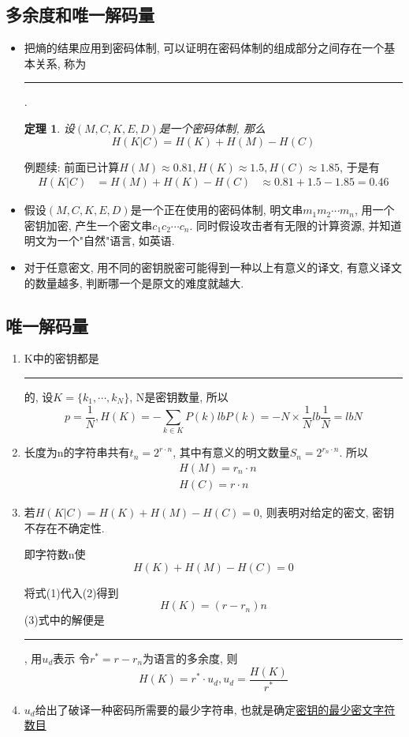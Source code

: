 \documentclass[UTF8]{ctexart}
\newcommand\hl{\bgroup\markoverwith
  {\textcolor{yellow}{\rule[-.5ex]{2pt}{2.5ex}}}\ULon}
\newtheorem{theorem}{\hspace{2em}定理}[section]
\begin{document}
\subsection{多余度和唯一解码量}
\begin{itemize}
  \item 把熵的结果应用到密码体制, 可以证明在密码体制的组成部分之间存在一个基本关系, 称为\hl{密钥暧昧度}.
  \begin{theorem}
    设$(M,C,K,E,D)$是一个密码体制, 那么
    $$H(K|C)=H(K)+H(M)-H(C)$$
  \end{theorem}

  例题续: 前面已计算$H(M)\approx 0.81, H(K)\approx 1.5, H(C)\approx 1.85$, 于是有
  $$
  \begin{aligned}
    H(K|C)&=H(M)+H(K)-H(C)
          &\approx 0.81+1.5-1.85=0.46
  \end{aligned}
  $$
  \item 假设$(M,C,K,E,D)$是一个正在使用的密码体制, 明文串$m_1m_2\cdots m_n$, 用一个密钥加密, 产生一个密文串$c_1c_2\cdots c_n$. 同时假设攻击者有无限的计算资源, 并知道明文为一个"自然"语言, 如英语.
  \item 对于任意密文, 用不同的密钥脱密可能得到一种以上有意义的译文, 有意义译文的数量越多, 判断哪一个是原文的难度就越大.
\end{itemize}

\subsection{唯一解码量}
\begin{enumerate}
  \item K中的密钥都是\hl{等概率}的, 设$K=\{k_1, \cdots, k_N\}$, N是密钥数量, 所以
  $$p=\frac{1}{N}, H(K)=-\sum\limits_{k\in K}P(k)lbP(k)=-N\times \frac{1}{N}lb\frac{1}{N}=lbN$$
  \item 长度为n的字符串共有$t_n=2^{r\cdot n}$, 其中有意义的明文数量$S_n=2^{r_n\cdot n}$. 所以
  \begin{equation}
    \begin{aligned}
      &H(M)=r_n\cdot n\\
      &H(C)=r\cdot n
    \end{aligned}
  \end{equation}
  \item 若$H(K|C)=H(K)+H(M)-H(C)=0$, 则表明对给定的密文, 密钥不存在不确定性.

  即字符数n使
  \begin{equation}
    H(K)+H(M)-H(C)=0
  \end{equation}

  将式(1)代入(2)得到
  \begin{equation}
    H(K)=(r-r_n)n
  \end{equation}
  (3)式中的解便是\hl{唯一解码量}, 用$u_d$表示
  令$r^*=r-r_n$为语言的多余度, 则
  $$H(K)=r^*\cdot u_d, u_d=\frac{H(K)}{r^*}$$

  \item $u_d$给出了破译一种密码所需要的最少字符串, 也就是确定\underline{密钥的最少密文字符数目}
\end{enumerate}
\end{document}
